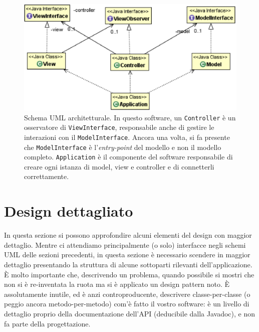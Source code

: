 \documentclass[a4paper,12pt]{report}
\begin{document}
\begin{figure}
\centering{}
\includegraphics[width=\textwidth]{img/mvc}
\caption{Schema UML architetturale. In questo software, un \texttt{Controller} è un osservatore di \texttt{ViewInterface}, responsabile anche di gestire le interazioni con il  \texttt{ModelInterface}. Ancora una volta, si fa presente che \texttt{ModelInterface} è l'\textit{entry-point} del modello e non il modello completo. \texttt{Application} è il componente del software responsabile di creare ogni istanza di model, view e controller e di connetterli correttamente.}

\label{img:goodarch}
\end{figure}


\section{Design dettagliato}

In questa sezione si possono approfondire alcuni elementi del design con maggior dettaglio.
%
Mentre ci attendiamo principalmente (o solo) interfacce negli schemi UML delle sezioni precedenti, in questa sezione è necessario scendere in maggior dettaglio presentando la struttura di alcune sottoparti rilevanti dell'applicazione.
%
È molto importante che, descrivendo un problema, quando possibile si mostri che non si è re-inventata la ruota ma si è applicato un design pattern noto.
%
È assolutamente inutile, ed è anzi controproducente, descrivere classe-per-classe (o peggio ancora metodo-per-metodo) com'è fatto il vostro software: è un livello di dettaglio proprio della documentazione dell'API (deducibile dalla Javadoc), e non fa parte della progettazione.
\end{document}
